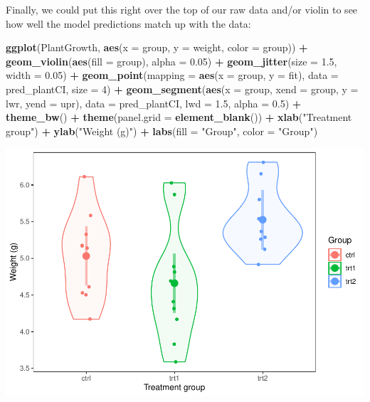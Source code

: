 \documentclass[
]{book}
\newenvironment{Shaded}{\begin{snugshade}}{\end{snugshade}}
\newcommand{\DataTypeTok}[1]{\textcolor[rgb]{0.13,0.29,0.53}{#1}}
\newcommand{\DecValTok}[1]{\textcolor[rgb]{0.00,0.00,0.81}{#1}}
\newcommand{\FloatTok}[1]{\textcolor[rgb]{0.00,0.00,0.81}{#1}}
\newcommand{\KeywordTok}[1]{\textcolor[rgb]{0.13,0.29,0.53}{\textbf{#1}}}
\newcommand{\NormalTok}[1]{#1}
\newcommand{\OperatorTok}[1]{\textcolor[rgb]{0.81,0.36,0.00}{\textbf{#1}}}
\newcommand{\StringTok}[1]{\textcolor[rgb]{0.31,0.60,0.02}{#1}}
\begin{document}
Finally, we could put this right over the top of our raw data and/or violin to see how well the model predictions match up with the data:

\begin{Shaded}
\begin{Highlighting}[]
\KeywordTok{ggplot}\NormalTok{(PlantGrowth, }\KeywordTok{aes}\NormalTok{(}\DataTypeTok{x =}\NormalTok{ group, }\DataTypeTok{y =}\NormalTok{ weight, }\DataTypeTok{color =}\NormalTok{ group)) }\OperatorTok{+}
\StringTok{  }\KeywordTok{geom_violin}\NormalTok{(}\KeywordTok{aes}\NormalTok{(}\DataTypeTok{fill =}\NormalTok{ group), }\DataTypeTok{alpha =} \FloatTok{0.05}\NormalTok{) }\OperatorTok{+}
\StringTok{  }\KeywordTok{geom_jitter}\NormalTok{(}\DataTypeTok{size =} \FloatTok{1.5}\NormalTok{, }\DataTypeTok{width =} \FloatTok{0.05}\NormalTok{) }\OperatorTok{+}
\StringTok{  }\KeywordTok{geom_point}\NormalTok{(}\DataTypeTok{mapping =} \KeywordTok{aes}\NormalTok{(}\DataTypeTok{x =}\NormalTok{ group, }\DataTypeTok{y =}\NormalTok{ fit), }
             \DataTypeTok{data =}\NormalTok{ pred_plantCI,}
             \DataTypeTok{size =} \DecValTok{4}\NormalTok{) }\OperatorTok{+}
\StringTok{  }\KeywordTok{geom_segment}\NormalTok{(}\KeywordTok{aes}\NormalTok{(}\DataTypeTok{x =}\NormalTok{ group, }\DataTypeTok{xend =}\NormalTok{ group, }\DataTypeTok{y =}\NormalTok{ lwr, }\DataTypeTok{yend =}\NormalTok{ upr),}
               \DataTypeTok{data =}\NormalTok{ pred_plantCI, }
               \DataTypeTok{lwd =} \FloatTok{1.5}\NormalTok{, }
               \DataTypeTok{alpha =} \FloatTok{0.5}\NormalTok{) }\OperatorTok{+}
\StringTok{  }\KeywordTok{theme_bw}\NormalTok{() }\OperatorTok{+}
\StringTok{  }\KeywordTok{theme}\NormalTok{(}\DataTypeTok{panel.grid =} \KeywordTok{element_blank}\NormalTok{()) }\OperatorTok{+}
\StringTok{  }\KeywordTok{xlab}\NormalTok{(}\StringTok{"Treatment group"}\NormalTok{) }\OperatorTok{+}
\StringTok{  }\KeywordTok{ylab}\NormalTok{(}\StringTok{"Weight (g)"}\NormalTok{) }\OperatorTok{+}
\StringTok{  }\KeywordTok{labs}\NormalTok{(}\DataTypeTok{fill =} \StringTok{"Group"}\NormalTok{, }\DataTypeTok{color =} \StringTok{"Group"}\NormalTok{)}
\end{Highlighting}
\end{Shaded}

\includegraphics{worstr_files/figure-latex/unnamed-chunk-262-1.pdf}
\end{document}
